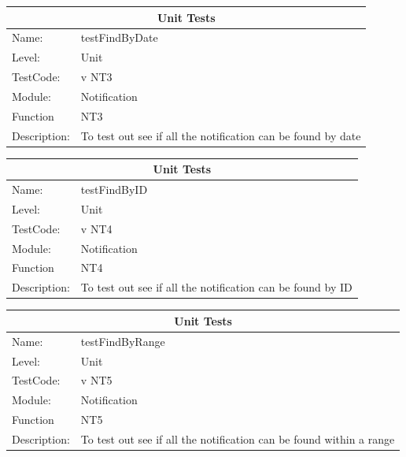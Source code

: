 \documentclass[12pt]{article}
\begin{document}
\begin{center}
\begin{tabular}{|l|p{12cm}|}
\hline
\multicolumn{2}{|c|}{\bf Unit Tests} \\
\hline
 Name: & testFindByDate  \\
\hline
Level: & Unit \\
\hline
TestCode: & v NT3 \\
\hline
Module:& Notification\\
\hline
Function & NT3 \\
\hline
Description: & To test out see if all the notification can be found by date \\
\hline

\end{tabular}
\end{center}

\begin{center}
\begin{tabular}{|l|p{12cm}|}
\hline
\multicolumn{2}{|c|}{\bf Unit Tests} \\
\hline
 Name: & testFindByID  \\
\hline
Level: & Unit \\
\hline
TestCode: & v NT4 \\
\hline
Module:& Notification\\
\hline
Function & NT4 \\
\hline
Description: & To test out see if all the notification can be found by ID \\
\hline

\end{tabular}
\end{center}

\begin{center}
\begin{tabular}{|l|p{12cm}|}
\hline
\multicolumn{2}{|c|}{\bf Unit Tests} \\
\hline
 Name: & testFindByRange  \\
\hline
Level: & Unit \\
\hline
TestCode: & v NT5 \\
\hline
Module:& Notification\\
\hline
Function & NT5 \\
\hline
Description: & To test out see if all the notification can be found within a range \\
\hline

\end{tabular}
\end{center}
\end{document}
